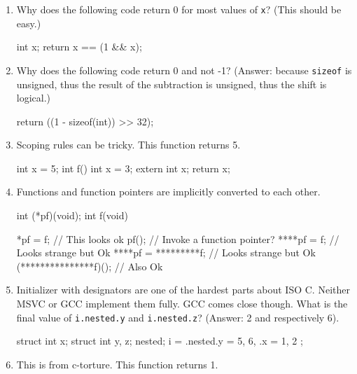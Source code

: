 \documentclass{article}
\def\t#1{{\tt #1}}
\begin{document}
\begin{enumerate}

\item Why does the following code return 0 for most values of \t{x}? (This
should be easy.)

\begin{cilcode}[local]
  int x;
  return x == (1 && x);
\end{cilcode}

\item Why does the following code return 0 and not -1? (Answer: because
\t{sizeof} is unsigned, thus the result of the subtraction is unsigned, thus
the shift is logical.)

\begin{cilcode}[local]
 return ((1 - sizeof(int)) >> 32);
\end{cilcode}

\item Scoping rules can be tricky. This function returns 5.

\begin{cilcode}[global]
int x = 5;
int f() {
  int x = 3;
  {
    extern int x;
    return x;
  }
}
\end{cilcode}

\item Functions and function pointers are implicitly converted to each other. 

\begin{cilcode}[global]
int (*pf)(void);
int f(void) {

   *pf = f; // This looks ok
   pf(); // Invoke a function pointer?     
   ****pf = f; // Looks strange but Ok
   ****pf = *********f; // Looks strange but Ok
   (***************f)(); // Also Ok             
}
\end{cilcode}

\item Initializer with designators are one of the hardest parts about ISO C.
Neither MSVC or GCC implement them fully. GCC comes close though. What is the
final value of \t{i.nested.y} and \t{i.nested.z}? (Answer: 2 and respectively
6). 

\begin{cilcode}[global]
struct { 
   int x; 
   struct { 
       int y, z; 
   } nested;
} i = { .nested.y = 5, 6, .x = 1, 2 };               
\end{cilcode}

\item This is from c-torture. This function returns 1.


\end{enumerate}
\end{document}
